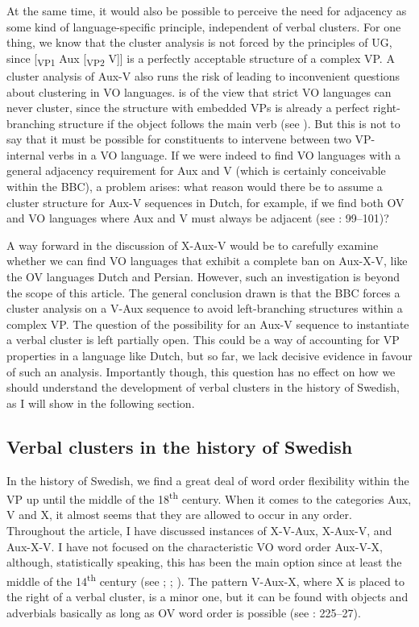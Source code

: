 \documentclass[output=paper, colorlinks, citecolor=brown]{langscibook}
\begin{document}
At the same time, it would also be possible to perceive the need for adjacency as some kind of language-specific principle, independent of verbal clusters. For one thing, we know that the cluster analysis is not forced by the principles of UG, since [\textsubscript{VP1} Aux [\textsubscript{VP2} V]] is a perfectly acceptable structure of a complex VP. A cluster analysis of Aux-V also runs the risk of leading to inconvenient questions about clustering in VO languages. \citet[343]{Haider2010} is of the view that strict VO languages can never cluster, since the structure with embedded VPs is already a perfect right-branching structure if the object follows the main verb (see ). But this is not to say that it must be possible for constituents to intervene between two VP-internal verbs in a VO language. If we were indeed to find VO languages with a general adjacency requirement for Aux and V (which is certainly conceivable within the BBC), a problem arises: what reason would there be to assume a cluster structure for Aux-V sequences in Dutch, for example, if we find both OV and VO languages where Aux and V must always be adjacent (see \citealt{Sheehan2017Final}: 99–101)?



A way forward in the discussion of X-Aux-V would be to carefully examine whether we can find VO languages that exhibit a complete ban on Aux-X-V, like the OV languages Dutch and Persian. However, such an investigation is beyond the scope of this article. The general conclusion drawn is that the BBC forces a cluster analysis on a V-Aux sequence to avoid left-branching structures within a complex VP. The question of the possibility for an Aux-V sequence to instantiate a verbal cluster is left partially open. This could be a way of accounting for VP properties in a language like Dutch, but so far, we lack decisive evidence in favour of such an analysis. Importantly though, this question has no effect on how we should understand the development of verbal clusters in the history of Swedish, as I will show in the following section.


\subsection{Verbal clusters in the history of Swedish}\label{sec:sangfelt:5.3}

In the history of Swedish, we find a great deal of word order flexibility within the VP up until the middle of the 18\textsuperscript{th} century. When it comes to the categories Aux, V and X, it almost seems that they are allowed to occur in any order. Throughout the article, I have discussed instances of X-V-Aux, X-Aux-V, and Aux-X-V. I have not focused on the characteristic VO word order Aux-V-X, although, statistically speaking, this has been the main option since at least the middle of the 14\textsuperscript{th} century (see \citealt{Delsing1999}; \citealt{Petzell2011}; \citealt{Sangfelt2019}). The pattern V-Aux-X, where X is placed to the right of a verbal cluster, is a minor one, but it can be found with objects and adverbials basically as long as OV word order is possible (see \citealt{Sangfelt2019}: 225–27).
\end{document}

